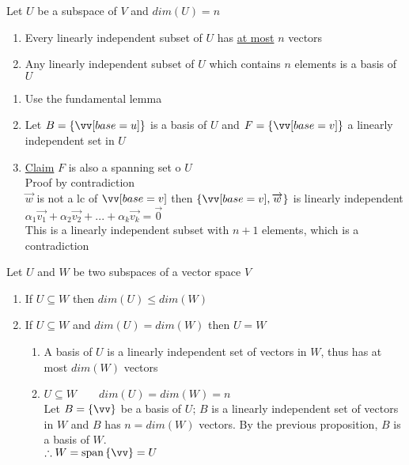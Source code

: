 \documentclass[12pt]{article}
\renewcommand{\v}[1]{\overrightarrow{#1}}
\newcommand{\vectorseqtwo}[2]{#1_1\v{#2_1} + #1_2\v{#2_2} + ... + #1_k\v{#2_k}}
\newenvironment{proof}{\block[Proof]}{\endblock}
\newenvironment{proposition}{\block[Proposition]}{\endblock}
\newcommand{\bb}[1]{\left\{#1\right\}}
\newcommand{\sspan}[1]{\text{span}\bb{#1}}
\begin{document}
\begin{proposition}
	Let $U$ be a subspace of $V$ and $dim(U) = n$
	
	\begin{enumerate}
		\item Every linearly independent subset of $U$ has \underline{at most} $n$ vectors
		\item Any linearly independent subset of $U$ which contains $n$ elements is a basis of $U$
	\end{enumerate}

	\begin{proof}
		\begin{enumerate}
			\item Use the fundamental lemma
			\item Let $B = \bb{\vv[base=u]}$ is a basis of $U$ and $F = \bb{\vv[base=v]}$ a linearly independent set in $U$
			\item \underline{Claim} $F$ is also a spanning set o $U$ \\
			Proof by contradiction \\
			$\v{w}$ is not a lc of $\vv[base=v]$ then $\bb{\vv[base=v], \v{w}}$ is linearly independent \\
			$\vectorseqtwo{\alpha}{v} = \v{0}$ \\
			This is a linearly independent subset with $n + 1$ elements, which is a contradiction
		\end{enumerate}
	\end{proof}
\end{proposition}

\begin{proposition}
	Let $U$ and $W$ be two subspaces of a vector space $V$
	\begin{enumerate}
		\item If $U \subseteq W$ then $dim(U) \le dim(W)$ 
		\item If $U \subseteq W$ and $dim(U) = dim(W)$ then $U = W$
		\begin{proof}
			\begin{enumerate}
				\item A basis of $U$ is a linearly independent set of vectors in $W$, thus has at most $dim(W)$ vectors
				\item $U \subseteq W \qquad dim(U) = dim(W) = n$ \\
				Let $B = \bb{\vv}$ be a basis of $U$; $B$ is a linearly independent set of vectors in $W$ and $B$ has $n = dim(W)$ vectors. By the previous proposition, $B$ is a basis of $W$. \\
				$\therefore W = \sspan{\vv} = U$
			\end{enumerate}
		\end{proof}
	\end{enumerate}
\end{proposition}
\end{document}

